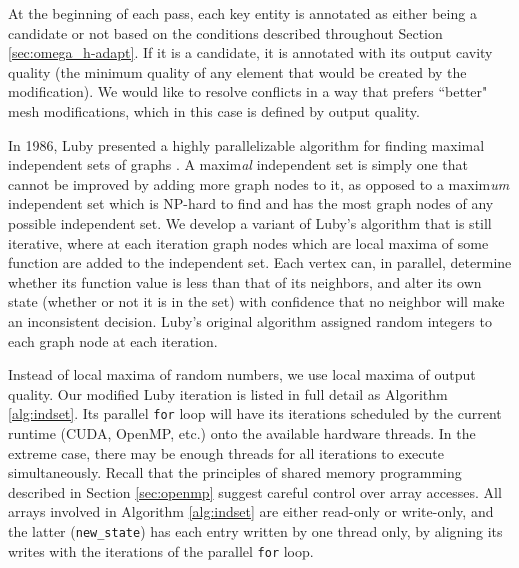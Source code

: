 At the beginning of each pass, each key entity is annotated as either
being a candidate or not based on the conditions described throughout
Section \ref{sec:omega_h-adapt}.
If it is a candidate, it is annotated with its output cavity quality
(the minimum quality of any element that would be created by the modification).
We would like to resolve conflicts in a way that prefers ``better" mesh
modifications, which in this case is defined by output quality.

In 1986, Luby presented a highly parallelizable algorithm
for finding maximal independent sets of graphs \cite{luby1986simple}.
A maxim\emph{al} independent set is simply one that cannot be improved by
adding more graph nodes to it, as opposed to a maxim\emph{um} independent
set which is NP-hard to find and has the most graph nodes of any
possible independent set.
We develop a variant of Luby's algorithm that is still iterative,
where at each iteration graph nodes which are local maxima of some function
are added to the independent set.
Each vertex can, in parallel, determine whether its function value is
less than that of its neighbors, and alter its own state
(whether or not it is in the set)
with confidence that no neighbor will make an inconsistent decision.
Luby's original algorithm assigned random integers to each graph node
at each iteration.

Instead of local maxima of random numbers, we use local maxima of
output quality.
Our modified Luby iteration is listed in full detail
as Algorithm \ref{alg:indset}.
Its parallel \texttt{for} loop will have its iterations scheduled by the
current runtime (CUDA, OpenMP, etc.) onto the available hardware threads.
In the extreme case, there may be enough threads for all iterations
to execute simultaneously.
Recall that the principles of shared memory programming described
in Section \ref{sec:openmp} suggest careful control over array accesses.
All arrays involved in Algorithm \ref{alg:indset} are either read-only
or write-only, and the latter (\texttt{new\_state}) has each entry written
by one thread only, by aligning its writes with the iterations
of the parallel \texttt{for} loop.

